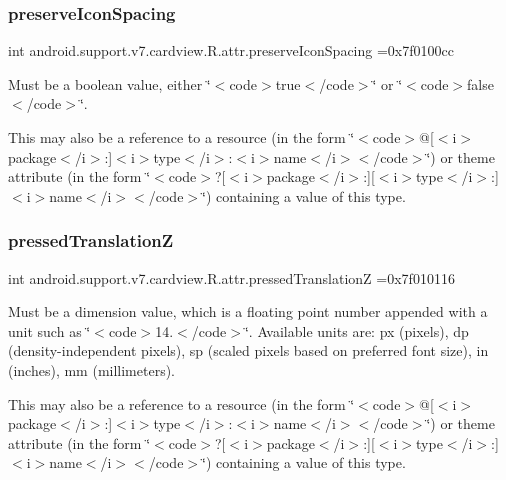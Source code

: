 \subsubsection{\texorpdfstring{preserve\+Icon\+Spacing}{preserveIconSpacing}}
{\footnotesize\ttfamily int android.\+support.\+v7.\+cardview.\+R.\+attr.\+preserve\+Icon\+Spacing =0x7f0100cc\hspace{0.3cm}{\ttfamily [static]}}

Must be a boolean value, either \char`\"{}$<$code$>$true$<$/code$>$\char`\"{} or \char`\"{}$<$code$>$false$<$/code$>$\char`\"{}. 

This may also be a reference to a resource (in the form \char`\"{}$<$code$>$@\mbox{[}$<$i$>$package$<$/i$>$\+:\mbox{]}$<$i$>$type$<$/i$>$\+:$<$i$>$name$<$/i$>$$<$/code$>$\char`\"{}) or theme attribute (in the form \char`\"{}$<$code$>$?\mbox{[}$<$i$>$package$<$/i$>$\+:\mbox{]}\mbox{[}$<$i$>$type$<$/i$>$\+:\mbox{]}$<$i$>$name$<$/i$>$$<$/code$>$\char`\"{}) containing a value of this type. \mbox{\label{classandroid_1_1support_1_1v7_1_1cardview_1_1R_1_1attr_af68484ea774a4ae05b7ada0004f66513}} 
\subsubsection{\texorpdfstring{pressed\+TranslationZ}{pressedTranslationZ}}
{\footnotesize\ttfamily int android.\+support.\+v7.\+cardview.\+R.\+attr.\+pressed\+TranslationZ =0x7f010116\hspace{0.3cm}{\ttfamily [static]}}

Must be a dimension value, which is a floating point number appended with a unit such as \char`\"{}$<$code$>$14.\+5sp$<$/code$>$\char`\"{}. Available units are\+: px (pixels), dp (density-\/independent pixels), sp (scaled pixels based on preferred font size), in (inches), mm (millimeters). 

This may also be a reference to a resource (in the form \char`\"{}$<$code$>$@\mbox{[}$<$i$>$package$<$/i$>$\+:\mbox{]}$<$i$>$type$<$/i$>$\+:$<$i$>$name$<$/i$>$$<$/code$>$\char`\"{}) or theme attribute (in the form \char`\"{}$<$code$>$?\mbox{[}$<$i$>$package$<$/i$>$\+:\mbox{]}\mbox{[}$<$i$>$type$<$/i$>$\+:\mbox{]}$<$i$>$name$<$/i$>$$<$/code$>$\char`\"{}) containing a value of this type. \mbox{\label{classandroid_1_1support_1_1v7_1_1cardview_1_1R_1_1attr_aa454ee24ba24198883f11140f1e6c87b}} 
